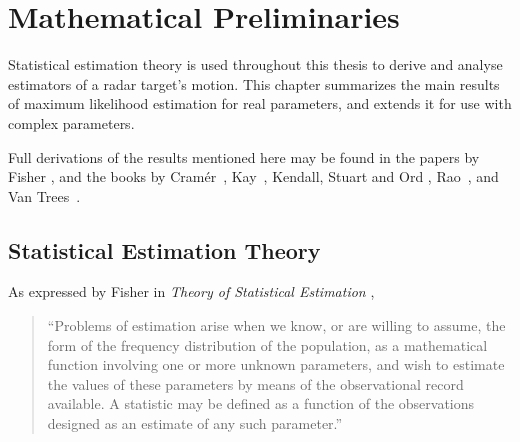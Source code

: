 %
%
%
%
%
%
%

\chapter{Mathematical Preliminaries}
\label{mp chp}

\bigletter Statistical estimation theory is used throughout this thesis to
derive and analyse estimators of a radar target's motion.  This chapter
summarizes the main results of maximum likelihood estimation for 
real parameters, and extends it for use with complex parameters.

Full derivations of the results mentioned here may be found in the papers by
Fisher \cite{Fis25,Fis34b,Fis34a}, and the books by Cram\'{e}r~\cite{Cra46}, 
Kay~\cite{Kay93}, Kendall, Stuart and Ord \cite{Stu87,Stu91}, 
Rao~\cite{Rao65}, and Van Trees~\cite{Van68}.

\section{Statistical Estimation Theory}

As expressed by Fisher in {\em Theory of Statistical Estimation\/}
\cite{Fis25}, 
\begin{quote}\singlespaced
``Problems of estimation arise when we know, or are willing to assume, the
form of the frequency distribution of the population, as a mathematical
function involving one or more unknown parameters, and wish to estimate the
values of these parameters by means of the observational record available. 
A statistic may be defined as a function of the observations designed as an
estimate of any such parameter.''
\hspace*{\fill}{\em R. A. Fisher, 1925.}
\end{quote}

